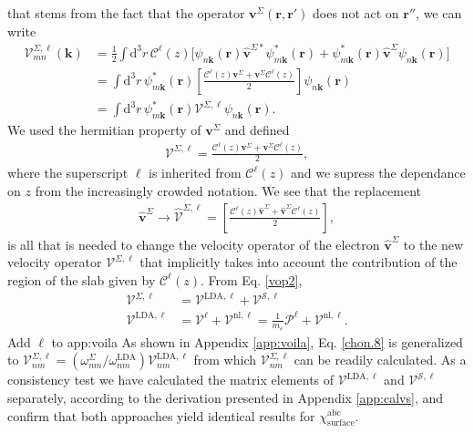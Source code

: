 that stems from the fact that the operator $\mathbf{v}^\Sigma(\mathbf{r},\mathbf{r}')$ does not act on
$\mathbf{r}''$, we can write
\begin{align}\label{nl.3}
\boldsymbol{\mathcal{V}}^{\Sigma,\ell}_{mn}({\mathbf k})
&=
\frac{1}{2}
\int \mathrm{d}^3 r\,
 \mathcal{C}^{\ell}(z)
 \bigg[
\psi_{n\mathbf{k}}(\mathbf{r})
\hat{\mathbf{v}}^{\Sigma *}\psi^{*}_{m\mathbf{k}}(\mathbf{r})
+ 
\psi^*_{m\mathbf{k}}(\mathbf{r})\hat{\mathbf{v}}^{\Sigma}
\psi_{n\mathbf{k}}(\mathbf{r})
\bigg]
\nonumber\\
&=
\int \mathrm{d}^3 r\,
\psi^*_{m\mathbf{k}}(\mathbf{r})
\left[\frac{\mathcal{C}^{\ell}(z) \mathbf{v}^\Sigma +
\mathbf{v}^\Sigma \mathcal{C}^{\ell}(z)}{2}\right]
\psi_{n\mathbf{k}}(\mathbf{r})
\nonumber\\
&=
\int \mathrm{d}^3 r\,
\psi^*_{m\mathbf{k}}(\mathbf{r})
\boldsymbol{\mathcal{V}}^{\Sigma,\ell}
\psi_{n\mathbf{k}}(\mathbf{r})
.
\end{align}
We used the hermitian property of $\mathbf{v}^\Sigma$ and defined
\begin{align}\label{nl.4}
\boldsymbol{\mathcal{V}}^{\Sigma,\ell}
=
\frac{\mathcal{C}^{\ell}(z) \mathbf{v}^\Sigma +
\mathbf{v}^\Sigma \mathcal{C}^{\ell}(z)}{2}
,
\end{align} 
where the superscript $\ell$ is inherited from $\mathcal{C}^{\ell}(z)$ and we
supress the dependance on $z$ from the increasingly crowded notation.  
We see that the replacement
\begin{align}\label{vcali}
\hat{\mathbf{v}}^{\Sigma} \to \hat{\boldsymbol{\mathcal{V}}}^{\Sigma,\ell}=\left[\frac{\mathcal{C}^{\ell}(z) \hat{\mathbf{v}}^{\Sigma} +
\hat{\mathbf{v}}^{\Sigma}\mathcal{C}^{\ell}(z)}{2}\right]
,
\end{align} 
is all that is needed to change the
velocity operator of the electron $\hat{\mathbf{v}}^{\Sigma}$ to the new velocity
operator $\boldsymbol{\mathcal{V}}^{\Sigma,\ell}$ that implicitly takes into account the
contribution of the region of the slab given by $\mathcal{C}^{\ell}(z)$.
From Eq. \eqref{vop2},
\begin{align}\label{vopii}
\boldsymbol{\mathcal{V}}^{\Sigma,\ell}
&=
\boldsymbol{\mathcal{V}}^{\mathrm{LDA},\ell}
+
\boldsymbol{\mathcal{V}}^{\mathcal{S},\ell}
\nonumber\\
\boldsymbol{\mathcal{V}}^{\mathrm{LDA},\ell}
&=
\boldsymbol{\mathcal{V}}^{\ell}
+
\boldsymbol{\mathcal{V}}^{\mathrm{nl},\ell}
=
\frac{1}{m_{e}}
\boldsymbol{\mathcal{P}}^{\ell}
+
\boldsymbol{\mathcal{V}}^{\mathrm{nl},\ell}
.
\end{align}
{\color{red} Add $\ell$ to app:voila}
As shown in Appendix \ref{app:voila}, Eq. \eqref{chon.8} is generalized to
$\boldsymbol{\mathcal{V}}^{\Sigma,\ell}_{nm} =
(\omega^\Sigma_{nm}/\omega^{\mathrm{LDA}}_{nm})
\boldsymbol{\mathcal{V}}^{\mathrm{LDA},\ell}_{nm}$ from which
$\boldsymbol{\mathcal{V}}^{\Sigma,\ell}_{nm}$ can be readily calculated. As a
consistency test we have calculated the matrix elements of
$\boldsymbol{\mathcal{V}}^{\mathrm{LDA},\ell}$ and
$\boldsymbol{\mathcal{V}}^{\mathcal{S},\ell}$ separately, according to the
derivation presented in Appendix \ref{app:calvs}, and confirm that both
approaches yield identical results for $\chi^{\mathrm{abc}}_{\mathrm{surface}}$.

